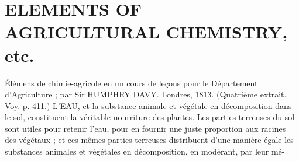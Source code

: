 \section{ELEMENTS OF AGRICULTURAL CHEMISTRY, etc.}
Élémens de chimie-agricole en un cours de leçons pour le Département d'Agriculture ; par Sir HUMPHRY DAVY. Londres, 1813. (Quatrième extrait. Voy. p. 411.)
L'EAU, et la substance animale et végétale en décomposition dans le sol, constituent la véritable nourriture des plantes. Les parties terreuses du sol sont utiles pour retenir l'eau, pour en fournir une juste proportion aux racines des végétaux ; et ces mêmes parties terreuses distribuent d'une manière égale les substances animales et végétales en décomposition, en modérant, par leur mé-